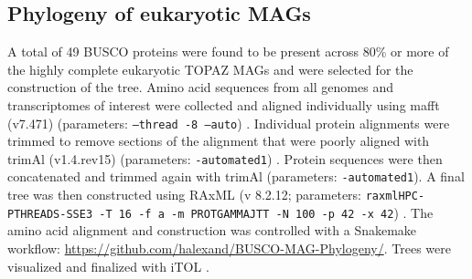 \documentclass[12pt]{article}
\numberwithin{equation}{section}
\begin{document}
\subsection*{Phylogeny of eukaryotic MAGs} 
A total of 49 BUSCO proteins were found to be present across 80\% or more of the highly complete eukaryotic TOPAZ MAGs and were selected for the construction of the tree. Amino acid sequences from all genomes and transcriptomes of interest were collected and aligned individually using mafft (v7.471) (parameters: \texttt{--thread -8 –auto}) \citep{Katoh2013MAFFT}. Individual protein alignments were trimmed to remove sections of the alignment that were poorly aligned with trimAl (v1.4.rev15) (parameters: \texttt{-automated1}) \citep{Capella-Gutierrez2009trimAl}. Protein sequences were then concatenated and trimmed again with trimAl (parameters: \texttt{-automated1}). A final tree was then constructed using RAxML (v 8.2.12; parameters: \texttt{raxmlHPC-PTHREADS-SSE3 -T 16 -f a -m PROTGAMMAJTT -N 100 -p 42 -x 42}) \citep{Stamatakis2014RAxML}. The amino acid alignment and construction was controlled with a Snakemake workflow: \url{https://github.com/halexand/BUSCO-MAG-Phylogeny/}. Trees were visualized and finalized with iTOL \citep{Letunic2016Interactive}. 
\end{document}
